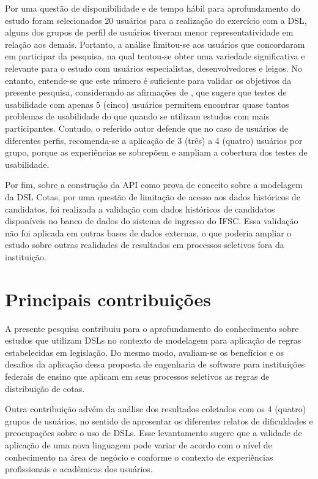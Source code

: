 Por uma questão de disponibilidade e de tempo hábil para aprofundamento do estudo foram selecionados 20 usuários para a realização do exercício com a DSL, alguns dos grupos de perfil de usuários tiveram menor representatividade em relação aos demais. Portanto, a análise limitou-se aos usuários que concordaram em participar da pesquisa, na qual tentou-se obter uma variedade significativa e relevante para o estudo com usuários especialistas, desenvolvedores e leigos. No entanto, entende-se que este número é suficiente para validar os objetivos da presente pesquisa, considerando as afirmações de , que sugere que testes de usabilidade com apenas 5 (cinco) usuários permitem encontrar quase tantos problemas de usabilidade do que quando se utilizam estudos com mais participantes. Contudo, o referido autor defende que no caso de usuários de diferentes perfis, recomenda-se a aplicação de 3 (três) a 4 (quatro) usuários por grupo, porque as experiências se sobrepõem e ampliam a cobertura dos testes de usabilidade. 

Por fim, sobre a construção da API como prova de conceito sobre a modelagem da DSL Cotas, por uma questão de limitação de acesso aos dados históricos de candidatos, foi realizada a validação com dados históricos de candidatos disponíveis no banco de dados do sistema de ingresso do \gls{IFSC}. Essa validação não foi aplicada em outras bases de dados externas, o que poderia ampliar o estudo sobre outras realidades de resultados em processos seletivos fora da instituição.

\section{Principais contribuições}
\label{principaiscontribuicoes}

A presente pesquisa contribuiu para o aprofundamento do conhecimento sobre estudos que utilizam \gls{DSL}s no contexto de modelagem para aplicação de regras estabelecidas em legislação. Do mesmo modo, avaliam-se os benefícios e os desafios da aplicação dessa proposta de engenharia de software para instituições federais de ensino que aplicam em seus processos seletivos as regras de distribuição de cotas. 

Outra contribuição advém da análise dos resultados coletados com os 4 (quatro) grupos de usuários, no sentido de apresentar os diferentes relatos de dificuldades e preocupações sobre o uso de DSLs. Esse levantamento sugere que a validade de aplicação de uma nova linguagem pode variar de acordo com o nível de conhecimento na área de negócio e conforme o contexto de experiências profissionais e acadêmicas dos usuários.

